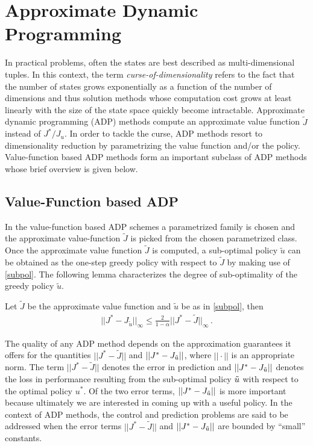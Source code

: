 \section{Approximate Dynamic Programming}
In practical problems, often the states are best described as multi-dimensional tuples.
In this context, the term \emph{curse-of-dimensionality} refers to the fact that the number of states
	grows exponentially as a function of the number of dimensions
	and thus solution methods whose computation cost grows at least linearly with the size of the state space
	quickly become intractable.
Approximate dynamic programming (ADP) \cite{lspi,lspe,ALP,wang2014approximate} methods compute an approximate value function $\tilde{J}$ instead of $J^*/J_u$. 
In order to tackle the curse, ADP methods resort to dimensionality reduction by parametrizing the value function and/or the policy. Value-function based ADP methods form an important subclass of ADP methods whose brief overview is given below.

\subsection{Value-Function based ADP}
In the value-function based ADP schemes a parametrized family is chosen and the approximate value-function $\tilde{J}$ is picked from the chosen parametrized class.
Once the approximate value function $\tilde{J}$ is computed, a sub-optimal policy $\tilde{u}$ can be obtained as the one-step greedy policy with respect to $\tilde{J}$ by making use of \eqref{subpol}.
The following lemma characterizes the degree of sub-optimality of the greedy policy $\tilde{u}$. 
\begin{lemma}\label{subopt}
Let $\tilde{J}$ be the approximate value function and $\tilde{u}$ be as in \eqref{subpol}, then 
\begin{align}
||J^*-J_{\tilde{u}}||_\infty \leq \frac{2}{1-\alpha}||J^*-\tilde{J}||_\infty\,.
\end{align}
\end{lemma}
The quality of any ADP method depends on the approximation guarantees it offers for the quantities $||J^*-\tilde{J}||$ and $||J^*-J_{\tilde{u}}||$, where $||\cdot||$ is an appropriate norm. The term  $||J^*-\tilde{J}||$ denotes the error in prediction and $||J^*-J_{\tilde{u}}||$ denotes the loss in performance resulting from the sub-optimal policy $\tilde{u}$ with respect to the optimal policy $u^*$. Of the two error terms, $||J^*-J_{\tilde{u}}||$ is more important because ultimately we are interested in coming up with a useful policy. In the context of ADP methods, the control and prediction problems are said to be addressed when the error terms $||J^*-\tilde{J}||$ and $||J^*-J_{\tilde{u}}||$ are bounded by ``small'' constants.

